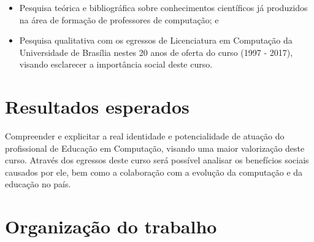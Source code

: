 \begin{itemize}
	\item Pesquisa teórica e bibliográfica sobre conhecimentos científicos já produzidos na área de formação de professores de computação; e
	\item Pesquisa qualitativa com os egressos de Licenciatura em Computação da Universidade de Brasília nestes 20 anos de oferta do curso (1997 - 2017), visando esclarecer a importância social deste curso.
	
\end{itemize}

\section{Resultados esperados}%


Compreender e explicitar a real identidade e potencialidade de atuação do profissional de Educação em Computação, visando uma maior valorização deste curso. Através dos egressos deste curso será possível analisar os benefícios sociais causados por ele, bem como a colaboração com a evolução da computação e da educação no país.



\section{Organização do trabalho}%